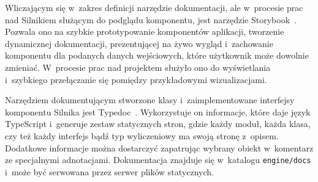 Wliczającym się w~zakres definicji narzędzie dokumentacji, ale w~procesie prac nad Silnikiem służącym do podglądu komponentu, jest narzędzie Storybook~\cite{Storybook}. Pozwala ono na szybkie prototypowanie komponentów aplikacji, tworzenie dynamicznej dokumentacji, prezentującej na żywo wygląd i~zachowanie komponentu dla podanych danych wejściowych, które użytkownik może dowolnie zmieniać. W~procesie prac nad projektem służyło ono do wyświetlania i~szybkiego przełączanie się pomiędzy przykładowymi wizualizacjami.

Narzędziem dokumentującym stworzone klasy i~zaimplementowane interfejsy komponentu Silnika jest Typedoc~\cite{Typedoc}. Wykorzystuje on informacje, które daje język TypeScript i~generuje zestaw statycznych stron, gdzie każdy moduł, każda klasa, czy też każdy interfejs bądź typ wyliczeniowy ma swoją stronę z~opisem. Dodatkowe informacje można dostarczyć zapatrując wybrany obiekt w~komentarz ze specjalnymi adnotacjami. Dokumentacja znajduje się w~katalogu \texttt{engine/docs} i~może być serwowana przez serwer plików statycznych.